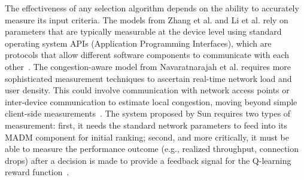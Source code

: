 The effectiveness of any selection algorithm depends on the ability to accurately measure its input criteria. The models from Zhang et al. and Li et al. rely on parameters that are typically measurable at the device level using standard operating system APIs (Application Programming Interfaces), which are protocols that allow different software components to communicate with each other~\cite{zhang2015, li2018}. The congestion-aware model from Navaratnarajah et al. requires more sophisticated measurement techniques to ascertain real-time network load and user density. This could involve communication with network access points or inter-device communication to estimate local congestion, moving beyond simple client-side measurements~\cite{navaratnarajah2017}. The system proposed by Sun requires two types of measurement: first, it needs the standard network parameters to feed into its MADM component for initial ranking; second, and more critically, it must be able to measure the performance outcome (e.g., realized throughput, connection drops) after a decision is made to provide a feedback signal for the Q-learning reward function~\cite{sun2019}.